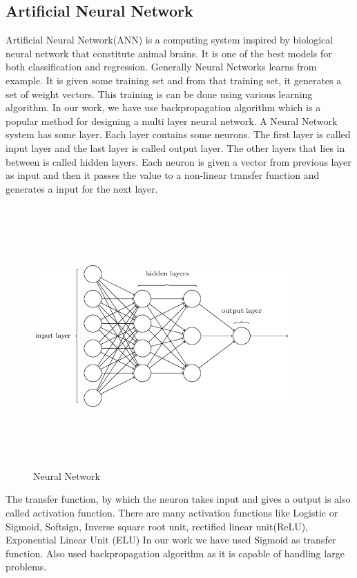 \documentclass[12pt,a4paper]{article}
\begin{document}
\subsection{Artificial Neural Network}
Artificial Neural Network(ANN) is a computing system inspired by biological neural network that constitute animal brains.\cite{vangerven2017artificial} It is one of the best models for both classification and regression. Generally Neural Networks learns from example. It is given some training set and from that training set, it generates a set of weight vectors. This training is can be done using various learning algorithm. In our work, we have use backpropagation algorithm which is a popular method for designing a multi layer neural network.\cite{leung1991complex} A Neural Network system has some layer. Each layer contains some neurons. The first layer is called input layer and the last layer is called output layer. The other layers that lies in between is called hidden layers. Each neuron is given a vector from previous layer as input and then it passes the value to a non-linear transfer function and generates a input for the next layer.\cite{hagan1996neural} 
\begin{figure}[!htb]
  \includegraphics[width=10cm,height=10cm,keepaspectratio]{neuralnet.png}
  \centering
  \caption{Neural Network}
  \label{fig:NeuralNet}
\end{figure}
The transfer function, by which the neuron takes input and gives a output is also called activation function. There are many activation functions like Logistic or Sigmoid, Softsign\cite{bergstra2009quadratic}, Inverse square root unit\cite{carlile2017improving}, rectified linear unit(ReLU)\cite{hinton2010rectified}, Exponential Linear Unit (ELU)\cite{clevert2015fast} In our work we have used Sigmoid as transfer function. Also used backpropagation algorithm as it is capable of handling large problems.\cite{hecht1992theory}  
\end{document}
